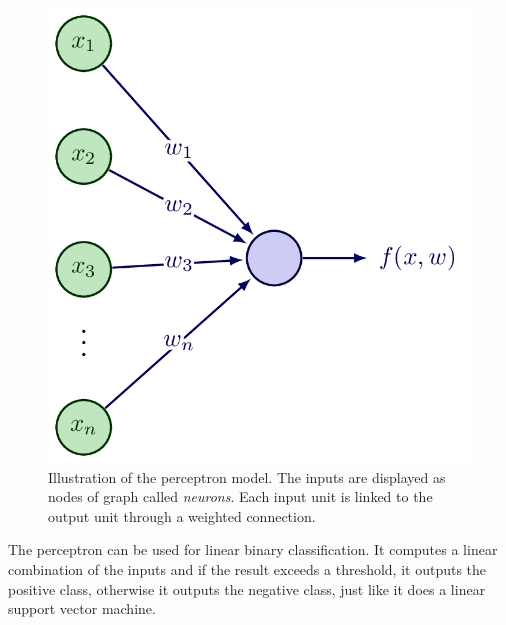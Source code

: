 \begin{figure}
    \centering
    \includegraphics[width=0.5\linewidth]{img/img-ch1/perceptron.png}
    \caption{Illustration of the perceptron model. The inputs are displayed as nodes of graph called \textit{neurons}. Each input unit is linked to the output unit through a weighted connection.}
    \label{fig:perceptron}
\end{figure}


The perceptron can be used for linear binary classification. It computes a linear combination of the inputs and if the result exceeds a threshold, it outputs the positive class, otherwise it outputs the negative class, just like it does a linear support vector machine. 

